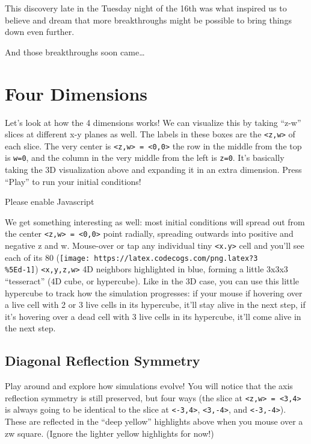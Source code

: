 \documentclass[]{article}
\begin{document}
This discovery late in the Tuesday night of the 16th was what inspired us to
believe and dream that more breakthroughs might be possible to bring things down
even further.

And those breakthroughs soon came\ldots{}

\hypertarget{four-dimensions}{%
\section{Four Dimensions}\label{four-dimensions}}

Let's look at how the 4 dimensions works! We can visualize this by taking
``z-w'' slices at different x-y planes as well. The labels in these boxes are
the \texttt{\textless{}z,w\textgreater{}} of each slice. The very center is
\texttt{\textless{}z,w\textgreater{}\ =\ \textless{}0,0\textgreater{}} the row
in the middle from the top is \texttt{w=0}, and the column in the very middle
from the left is \texttt{z=0}. It's basically taking the 3D visualization above
and expanding it in an extra dimension. Press ``Play'' to run your initial
conditions!

\leavevmode\hypertarget{gol4D}{}%
Please enable Javascript

We get something interesting as well: most initial conditions will spread out
from the center
\texttt{\textless{}z,w\textgreater{}\ =\ \textless{}0,0\textgreater{}} point
radially, spreading outwards into positive and negative z and w. Mouse-over or
tap any individual tiny \texttt{\textless{}x.y\textgreater{}} cell and you'll
see each of its 80
(\texttt{[image: https://latex.codecogs.com/png.latex?3\\\%5Ed-1]})
\texttt{\textless{}x,y,z,w\textgreater{}} 4D neighbors highlighted in blue,
forming a little 3x3x3 ``tesseract'' (4D cube, or hypercube). Like in the 3D
case, you can use this little hypercube to track how the simulation progresses:
if your mouse if hovering over a live cell with 2 or 3 live cells in its
hypercube, it'll stay alive in the next step, if it's hovering over a dead cell
with 3 live cells in its hypercube, it'll come alive in the next step.

\hypertarget{diagonal-reflection-symmetry}{%
\subsection{Diagonal Reflection Symmetry}\label{diagonal-reflection-symmetry}}

Play around and explore how simulations evolve! You will notice that the axis
reflection symmetry is still preserved, but four ways (the slice at
\texttt{\textless{}z,w\textgreater{}\ =\ \textless{}3,4\textgreater{}} is always
going to be identical to the slice at \texttt{\textless{}-3,4\textgreater{}},
\texttt{\textless{}3,-4\textgreater{}}, and
\texttt{\textless{}-3,-4\textgreater{}}). These are reflected in the ``deep
yellow'' highlights above when you mouse over a zw square. (Ignore the lighter
yellow highlights for now!)
\end{document}

